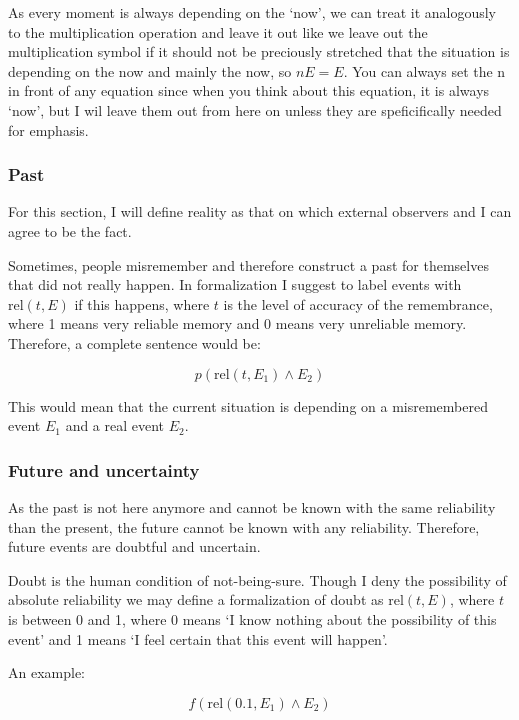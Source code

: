 \documentclass{scrartcl}
\begin{document}
As every moment is always depending on the `now', we can treat it analogously to the multiplication operation 
and leave it out like we leave out the multiplication symbol if it should not be preciously stretched that the
situation is depending on the now and mainly the now, so $n E = E$. You can always set the n in front of
any equation since when you think about this equation, it is always `now', but I wil leave them out from here on
unless they are speficifically needed for emphasis.

\subsubsection{Past}

For this section, I will define reality as that on which external observers and I can agree to be the fact.

Sometimes, people misremember and therefore construct a past for themselves that did not really happen. In formalization
I suggest to label events with $\mathrm{rel}(t, E)$ if this happens, where $t$ is the level of accuracy of the
remembrance, where 1 means very reliable memory and 0 means very unreliable memory. Therefore, a complete sentence would be:

\begin{equation} p \left( \textrm{rel}(t, E_1) \wedge E_2 \right) \end{equation}

This would mean that the current situation is depending on a misremembered event $E_1$ and a real event
$E_2$.

\subsubsection{Future and uncertainty}

As the past is not here anymore and cannot be known with the same reliability than the present, the future
cannot be known with any reliability. Therefore, future events are doubtful and uncertain. 

Doubt is the human condition of not-being-sure. Though I deny the possibility of absolute reliability we
may define a formalization of doubt as $\textrm{rel}(t, E)$, where $t$ is between 0 and 1, where 0 means
`I know nothing about the possibility of this event' and 1 means `I feel certain that this event will happen'.

An example:

\begin{equation} f \left( \textrm{rel}(0.1, E_1) \wedge E_2 \right) \end{equation}
\end{document}
